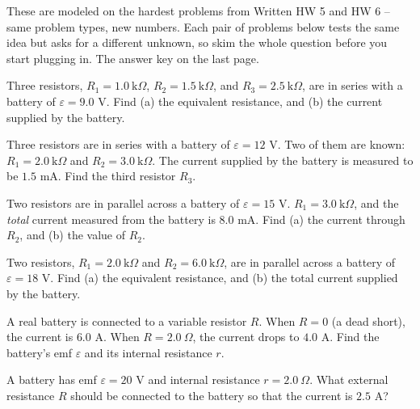 \documentclass[12pt]{article}
\begin{document}

\noindent These are modeled on the hardest problems from Written HW 5 and
HW 6 -- same problem types, new numbers. Each pair of problems below
tests the same idea but asks for a different unknown, so skim the whole
question before you start plugging in. 
The answer key on the last page.


\prob Three resistors, $R_1=1.0\ \text{k}\Omega$, $R_2=1.5\ \text{k}\Omega$,
and $R_3=2.5\ \text{k}\Omega$, are in series with a battery of
$\varepsilon=9.0$ V. Find (a) the equivalent resistance, and (b) the
current supplied by the battery.


\prob Three resistors are in series with a battery of $\varepsilon=12$ V.
Two of them are known: $R_1=2.0\ \text{k}\Omega$ and
$R_2=3.0\ \text{k}\Omega$. The current supplied by the battery is measured
to be $1.5$ mA. Find the third resistor $R_3$.


\prob Two resistors are in parallel across a battery of $\varepsilon=15$
V. $R_1=3.0\ \text{k}\Omega$, and the \emph{total} current measured from
the battery is $8.0$ mA. Find (a) the current through $R_2$, and (b) the
value of $R_2$.


\prob Two resistors, $R_1=2.0\ \text{k}\Omega$ and
$R_2=6.0\ \text{k}\Omega$, are in parallel across a battery of
$\varepsilon=18$ V. Find (a) the equivalent resistance, and (b) the total
current supplied by the battery.


\clearpage

\prob A real battery is connected to a variable resistor $R$. When
$R=0$ (a dead short), the current is $6.0$ A. When $R=2.0\ \Omega$, the
current drops to $4.0$ A. Find the battery's emf $\varepsilon$ and its
internal resistance $r$.


\prob A battery has emf $\varepsilon=20$ V and internal resistance
$r=2.0\ \Omega$. What external resistance $R$ should be connected to the
battery so that the current is $2.5$ A?

\end{document}
